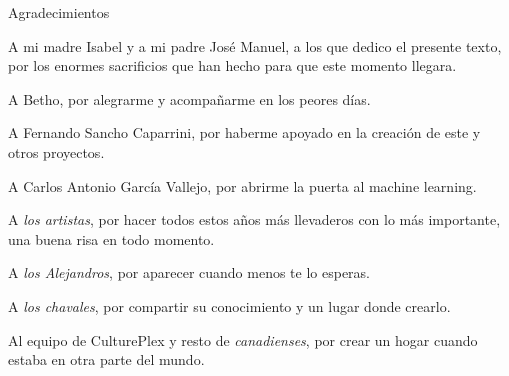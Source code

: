 {

\thispagestyle{plain}

\vspace*{10mm}

\begin{center}
{\LARGE
Agradecimientos}
\end{center}

\vspace*{5mm}

\begin{center}
A mi madre Isabel y a mi padre José Manuel, a los que dedico el presente texto, por los enormes sacrificios que han hecho para que este momento llegara.

A Betho, por alegrarme y acompañarme en los peores días.

A Fernando Sancho Caparrini, por haberme apoyado en la creación de este y otros proyectos.

A Carlos Antonio García Vallejo, por abrirme la puerta al machine learning.

A \emph{los artistas}, por hacer todos estos años más llevaderos con lo más importante, una buena risa en todo momento.

A \emph{los Alejandros}, por aparecer cuando menos te lo esperas.

A \emph{los chavales}, por compartir su conocimiento y un lugar donde crearlo.

Al equipo de CulturePlex y resto de \emph{canadienses}, por crear un hogar cuando estaba en otra parte del mundo.
\end{center}

\newpage
\thispagestyle{empty}
\mbox{ }

}
